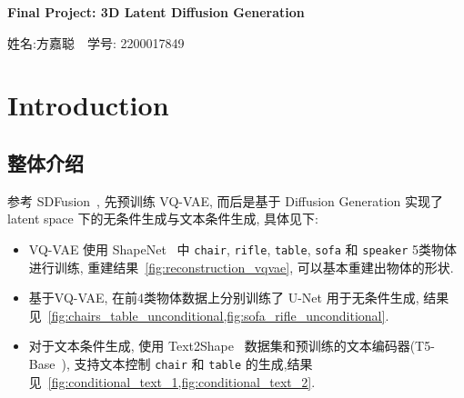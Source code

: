 \documentclass[11pt]{article}
\newcommand\1{\mathds{1}}
\begin{document}
\pagestyle{fancy}
\chead{}
\fancyfoot[R]{} 
\fancyfoot[C]{\thepage\ /\ \pageref{LastPage} \\ \textcolor{lightgray}{最后编译时间: \today}}


\begin{center}
    {\LARGE \bf Final Project: 3D Latent Diffusion Generation} 

    {\kaishu 姓名:方嘉聪\ \  学号: 2200017849}            %
\end{center}

\section{Introduction}
\subsection{整体介绍}
参考 SDFusion~\cite{cheng2023sdfusion}, 先预训练 VQ-VAE, 而后是基于 Diffusion Generation 实现了 latent space 下的无条件生成与文本条件生成, 具体见下:
\begin{itemize}
    \item VQ-VAE 使用 ShapeNet~\cite{shapenet} 中 \texttt{chair}, \texttt{rifle}, \texttt{table}, \texttt{sofa} 和 \texttt{speaker} 5类物体进行训练, 重建结果~\cref{fig:reconstruction_vqvae}, 可以基本重建出物体的形状.
    \item 基于VQ-VAE, 在前4类物体数据上分别训练了 U-Net 用于无条件生成, 结果见~\cref{fig:chairs_table_unconditional,fig:sofa_rifle_unconditional}.
    \item 对于文本条件生成, 使用 Text2Shape~\cite{chen2018text2shape} 数据集和预训练的文本编码器(T5-Base~\cite{2020t5}), 
    支持文本控制 \texttt{chair} 和 \texttt{table} 的生成,结果见~\cref{fig:conditional_text_1,fig:conditional_text_2}. 
\end{itemize}
\end{document}
